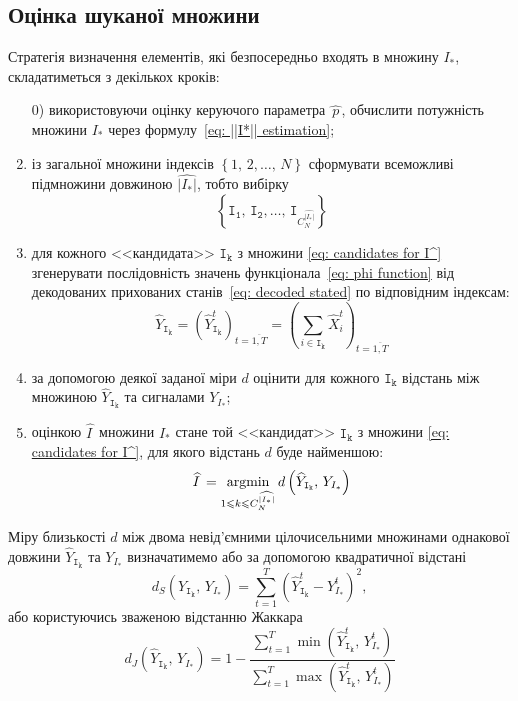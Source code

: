 \subsection{Оцінка шуканої множини}

Стратегія визначення елементів, які безпосередньо входять в множину $I_*$, складатиметься з декількох кроків:
\begin{enumerate}
    \item[0)] використовуючи оцінку керуючого параметра $\widehat{\,p\,}$, обчислити потужність множини $I_*$ через формулу~\eqref{eq: ||I*|| estimation};
    \item із загальної множини індексів $\left\{ 1,\,2,\ldots,\,N \right\}$ сформувати всеможливі підмножини довжиною $\widehat{|I_*|}$, тобто вибірку 
    \begin{equation}\label{eq: candidates for I^}
        \left\{ \mathtt{I_1},\,\mathtt{I_2},\ldots,\,\mathtt{I}_{C^{\widehat{|I_*|}}_N} \right\}
    \end{equation}
    \item для кожного <<кандидата>> $\mathtt{I_k}$ з множини \eqref{eq: candidates for I^} згенерувати послідовність значень функціонала~\eqref{eq: phi function} від декодованих прихованих станів~\eqref{eq: decoded stated} по відповідним індексам:
    \begin{equation*}
        \widehat{Y}_{\mathtt{I_k}} = \left( \widehat{Y}^t_{\mathtt{I_k}} \right)_{t=\overline{1,T}} = \left( \sum_{i \in \mathtt{I_k}} \widehat{X}^t_i \right)_{t=\overline{1,T}}
    \end{equation*}
    \item за допомогою деякої заданої міри $d$ оцінити для кожного $\mathtt{I_k}$ відстань між множиною $\widehat{Y}_{\mathtt{I_k}}$ та сигналами $Y_{I_*}$;
    \item оцінкою $\widehat{I\,}$ множини $I_*$ стане той <<кандидат>> $\mathtt{I_k}$ з множини \eqref{eq: candidates for I^}, для якого відстань $d$ буде найменшою:
    \begin{equation}\label{eq: I^ estimation}
        \widehat{I\,} = \operatorname*{argmin}\limits_{1\leqslant k \leqslant C^{\widehat{|I_*|}}_N}{d\left( \widehat{Y}_{\mathtt{I_k}},\,Y_{I_*} \right)}
    \end{equation}
\end{enumerate}

Міру близькості $d$ між двома невід'ємними цілочисельними множинами однакової довжини $\widehat{Y}_{\mathtt{I_k}}$ та $Y_{I_*}$ визначатимемо або за допомогою квадратичної відстані
\begin{equation}\label{eq: square average distance}
    d_{S}\left( \widehat{Y}_{\mathtt{I_k}},\,Y_{I_*} \right) = \sum_{t=1}^{T}\left( \widehat{Y}^t_{\mathtt{I_k}} - Y^t_{I_*} \right)^2,
\end{equation}
або користуючись зваженою відстанню Жаккара~\cite{Chierichetti2010}
\begin{equation}\label{eq: weighted Jaccard distance}
    d_{J}\left( \widehat{Y}_{\mathtt{I_k}},\,Y_{I_*} \right) = 1 - \frac{\sum\limits_{t=1}^{T}\min{\left( \widehat{Y}^t_{\mathtt{I_k}},\,Y^t_{I_*} \right)}}{\sum\limits_{t=1}^{T}\max{\left( \widehat{Y}^t_{\mathtt{I_k}},\,Y^t_{I_*} \right)}}
\end{equation}

